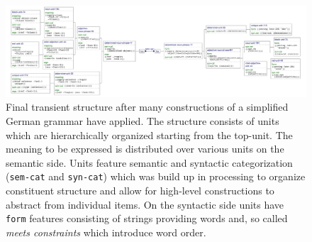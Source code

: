 \begin{figure}
\begin{center}
\includegraphics[width=1.0\columnwidth]{figs/simple-grammar-final}
\end{center}
\caption[Final transient structure]{Final transient structure after 
many constructions of a simplified German grammar have applied.
The structure consists of units which are hierarchically organized starting
from the top-unit. The meaning to be expressed is distributed over various 
units on the semantic side. Units feature 
semantic and syntactic categorization ({\footnotesize\tt sem-cat} and {\footnotesize\tt syn-cat})
which was build up in processing to organize constituent structure and
allow for high-level constructions to abstract from individual items.
On the syntactic side units have {\footnotesize\tt form} features consisting
of strings providing words and, so called  \emph{meets constraints} which introduce 
word order.}
\label{f:final-structure}
\end{figure}

